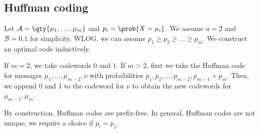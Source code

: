 \subsection{Huffman coding}
Let $\mathcal A = \qty{\mu_1, \dots, \mu_m}$ and $p_i = \prob{X = \mu_i}$.
We assume $a = 2$ and $\mathcal B = \qty{0,1}$ for simplicity.
WLOG, we can assume $p_1 \geq p_2 \geq \dots \geq p_m$.
We construct an optimal code inductively.

If $m = 2$, we take codewords $0$ and $1$.
If $m > 2$, first we take the Huffman code for messages $\mu_1, \dots, \mu_{m-2}, \nu$ with probabilities $p_1, p_2, \dots, p_{m-2}, p_{m-1} + p_m$.
Then, we append 0 and 1 to the codeword for $\nu$ to obtain the new codewords for $\mu_{m-1}, \mu_m$.
\begin{remark}
    By construction, Huffman codes are prefix-free.
    In general, Huffman codes are not unique; we require a choice if $p_i = p_j$.
\end{remark}

